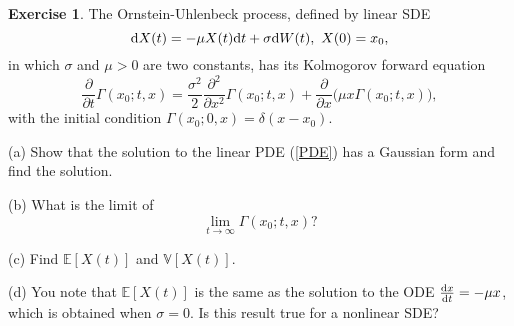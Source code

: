 \documentclass[12pt]{article}
\def\rd{{\rm d}}
\theoremstyle{definition}
\newtheorem{exer}{Exercise}
\theoremstyle{remark}
\begin{document}
\begin{exer}
The Ornstein-Uhlenbeck process, defined
by linear SDE
\[
   \rd X(t) = -\mu X(t) \rd t +\sigma \rd W(t),   \
            X(0)=x_0,
\] 
in which $\sigma$ and $\mu>0$ are two constants, has its
Kolmogorov forward equation
\begin{equation}
      \frac{\partial}{\partial t} \Gamma(x_0;t,x)
  =  \frac{\sigma^2}{2}\frac{\partial^2}{\partial x^2}
          \Gamma(x_0;t,x)
          + \frac{\partial}{\partial x}\Big( \mu x\Gamma(x_0;t,x)
            \Big),
\label{PDE}
\end{equation}
with the initial condition $\Gamma(x_0;0,x)=\delta(x-x_0)$.


(a) Show that the solution to the linear PDE (\ref{PDE}) has 
a Gaussian form and find the solution.

(b)  What is the limit of 
\[
   \lim_{t\to\infty} \Gamma(x_0;t,x)?
\]

(c)  Find $\mathbb{E}[X(t)]$ and $\mathbb{V}[X(t)]$.

(d)  You note that $\mathbb{E}[X(t)]$ is the same as 
the solution to the ODE $\frac{\rd x}{\rd t} = -\mu x$,
which is obtained when $\sigma=0$.
Is this result true for a nonlinear SDE?
\end{exer}
\end{document}

